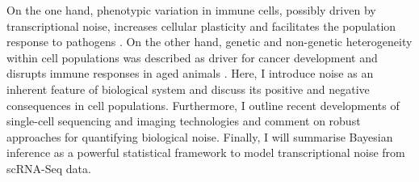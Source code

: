 \begin{Abstract}
On the one hand, phenotypic variation in immune cells, possibly driven by transcriptional noise, increases cellular plasticity and facilitates the population response to pathogens \citep{Shalek2014, Kellogg2015a}. 
On the other hand, genetic and non-genetic heterogeneity within cell populations was described as driver for cancer development \citep{Marusyk2012} and disrupts immune responses in aged animals \citep{Martinez-jimenez2017}. 
Here, I introduce noise as an inherent feature of biological system and discuss its positive and negative consequences in cell populations. 
Furthermore, I outline recent developments of single-cell sequencing and imaging technologies and comment on robust approaches for quantifying biological noise. 
Finally, I will summarise Bayesian inference as a powerful statistical framework to model transcriptional noise from \gls{scRNA-Seq} data.
\end{Abstract}

\newpage


\newpage

\newpage

\newpage

\newpage

\newpage

